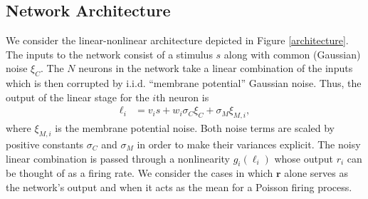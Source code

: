 \documentclass[11pt]{article}
\begin{document}
	\subsection{Network Architecture}
	We consider the linear-nonlinear architecture depicted in Figure \ref{architecture}. The inputs to the network consist of a stimulus $s$ along with common (Gaussian) noise $\xi_C$. The $N$ neurons in the network take a linear combination of the inputs which is then corrupted by i.i.d. ``membrane potential'' Gaussian noise. Thus, the output of the linear stage for the $i$th neuron is 
	\begin{align}
		\ell_i &= v_i s + w_i \sigma_C \xi_C + \sigma_M\xi_{M,i},
	\end{align}
	where $\xi_{M,i}$ is the membrane potential noise. Both noise terms are scaled by positive constants $\sigma_C$ and $\sigma_M$ in order to make their variances explicit. The noisy linear combination is passed through a nonlinearity $g_i(\ell_i)$ whose output $r_i$ can be thought of as a firing rate. We consider the cases in which $\mathbf{r}$ alone serves as the network's output and when it acts as the mean for a Poisson firing process.
	
\end{document}
